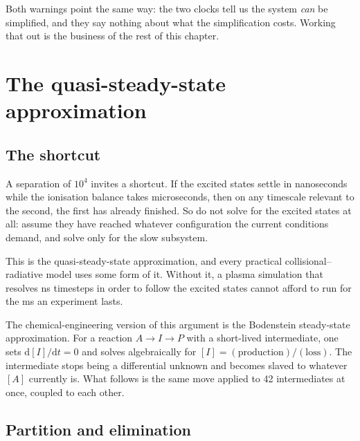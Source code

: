 Both warnings point the same way: the two clocks tell us the system \emph{can}
be simplified, and they say nothing about what the simplification costs. Working
that out is the business of the rest of this chapter.

\section{The quasi-steady-state approximation}
\label{sec:qss}

\subsection{The shortcut}

A separation of $10^{4}$ invites a shortcut. If the excited states settle
in nanoseconds while the ionisation balance takes microseconds, then on any
timescale relevant to the second, the first has already finished. So do not
solve for the excited states at all: assume they have reached whatever
configuration the current conditions demand, and solve only for the slow
subsystem.

This is the quasi-steady-state approximation, and every practical
collisional--radiative model uses some form of it. Without it, a plasma
simulation that resolves \si{\nano\second} timesteps in order to follow the
excited states cannot afford to run for the \si{\milli\second} an experiment
lasts.

The chemical-engineering version of this argument is the Bodenstein
steady-state approximation. For a reaction $A \to I \to P$ with a short-lived
intermediate, one sets $\mathrm{d}[I]/\mathrm{d}t = 0$ and solves algebraically
for $[I] = (\text{production})/(\text{loss})$. The intermediate stops being a
differential unknown and becomes slaved to whatever $[A]$ currently is. What
follows is the same move applied to 42 intermediates at once, coupled to each
other.

\subsection{Partition and elimination}

